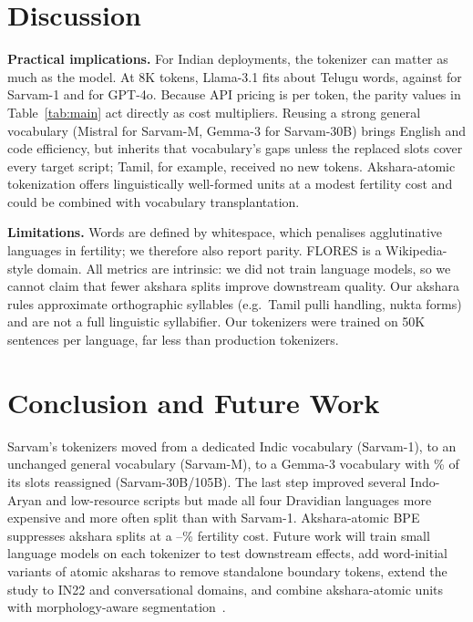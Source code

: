 \documentclass[conference]{IEEEtran}
\begin{document}
\section{Discussion}
\textbf{Practical implications.} For Indian deployments, the tokenizer can matter as much as the model. At 8K tokens, Llama-3.1 fits about  Telugu words, against  for Sarvam-1 and  for GPT-4o. Because API pricing is per token, the parity values in Table~\ref{tab:main} act directly as cost multipliers. Reusing a strong general vocabulary (Mistral for Sarvam-M, Gemma-3 for Sarvam-30B) brings English and code efficiency, but inherits that vocabulary's gaps unless the replaced slots cover every target script; Tamil, for example, received no new tokens. Akshara-atomic tokenization offers linguistically well-formed units at a modest fertility cost and could be combined with vocabulary transplantation.

\textbf{Limitations.} Words are defined by whitespace, which penalises agglutinative languages in fertility; we therefore also report parity. FLORES is a Wikipedia-style domain. All metrics are intrinsic: we did not train language models, so we cannot claim that fewer akshara splits improve downstream quality. Our akshara rules approximate orthographic syllables (e.g.\ Tamil pulli handling, nukta forms) and are not a full linguistic syllabifier. Our tokenizers were trained on 50K sentences per language, far less than production tokenizers.

\section{Conclusion and Future Work}
Sarvam's tokenizers moved from a dedicated Indic vocabulary (Sarvam-1), to an unchanged general vocabulary (Sarvam-M), to a Gemma-3 vocabulary with \% of its slots reassigned (Sarvam-30B/105B). The last step improved several Indo-Aryan and low-resource scripts but made all four Dravidian languages more expensive and more often split than with Sarvam-1. Akshara-atomic BPE suppresses akshara splits at a --\% fertility cost. Future work will train small language models on each tokenizer to test downstream effects, add word-initial variants of atomic aksharas to remove standalone boundary tokens, extend the study to IN22 and conversational domains, and combine akshara-atomic units with morphology-aware segmentation~\cite{brahma2025morphtok}.



\end{document}
